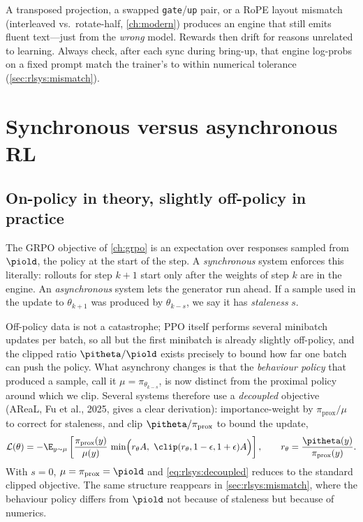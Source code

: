\begin{pitfall}
A transposed projection, a swapped \texttt{gate}/\texttt{up} pair, or a RoPE layout mismatch
(interleaved vs.\ rotate-half, \cref{ch:modern}) produces an engine that still emits fluent
text---just from the \emph{wrong} model. Rewards then drift for reasons unrelated to learning.
Always check, after each sync during bring-up, that engine log-probs on a fixed prompt match
the trainer's to within numerical tolerance (\cref{sec:rlsys:mismatch}).
\end{pitfall}
\section{Synchronous versus asynchronous RL}\label{sec:rlsys:async}

\subsection{On-policy in theory, slightly off-policy in practice}

The GRPO objective of \cref{ch:grpo} is an expectation over responses sampled from
$\piold$, the policy at the start of the step. A \emph{synchronous} system enforces this
literally: rollouts for step $k+1$ start only after the weights of step $k$ are in the
engine. An \emph{asynchronous} system lets the generator run ahead. If a sample used in the
update to $\theta_{k+1}$ was produced by $\theta_{k-s}$, we say it has \emph{staleness} $s$.

Off-policy data is not a catastrophe; PPO itself performs several minibatch updates per batch,
so all but the first minibatch is already slightly off-policy, and the clipped ratio
$\pitheta/\piold$ exists precisely to bound how far one batch can push the policy. What
asynchrony changes is that the \emph{behaviour policy} that produced a sample, call it
$\mu = \pi_{\theta_{k-s}}$, is now distinct from the proximal policy around which we clip.
Several systems therefore use a \emph{decoupled} objective (AReaL, Fu et al., 2025, gives a
clear derivation): importance-weight by $\pi_{\text{prox}}/\mu$ to correct for staleness, and
clip $\pitheta/\pi_{\text{prox}}$ to bound the update,
\begin{equation}
\mathcal{L}(\theta) = -\E_{y\sim\mu}\left[\frac{\pi_{\text{prox}}(y)}{\mu(y)}\,
\min\!\Big(r_\theta A,\ \clip(r_\theta,1-\epsilon,1+\epsilon)A\Big)\right],\qquad
r_\theta = \frac{\pitheta(y)}{\pi_{\text{prox}}(y)}.
\label{eq:rlsys:decoupled}
\end{equation}
With $s=0$, $\mu=\pi_{\text{prox}}=\piold$ and \cref{eq:rlsys:decoupled} reduces to the
standard clipped objective. The same structure reappears in \cref{sec:rlsys:mismatch}, where
the behaviour policy differs from $\piold$ not because of staleness but because of numerics.

